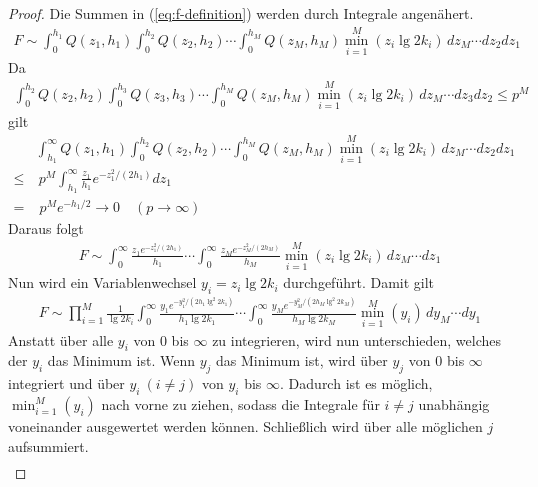 \documentclass[a4paper, 11pt, ngerman]{article}
\theoremstyle{definition}
\theoremstyle{plain}
\theoremstyle{remark}
\begin{document}
\begin{proof}
    Die Summen in (\ref{eq:f-definition}) werden durch Integrale angenähert.
    \begin{align*}
        F \sim
        \int_0^{h_1} Q(z_1, h_1)
        \int_0^{h_2} Q(z_2, h_2) \cdots
        \int_0^{h_M} Q(z_M, h_M)
        \min_{i = 1}^M(z_i \lg 2k_i) \, dz_M \cdots dz_2 dz_1
    \end{align*}
    Da
    \begin{align*}
        \int_0^{h_2} Q(z_2, h_2)
        \int_0^{h_3} Q(z_3, h_3) \cdots
        \int_0^{h_M} Q(z_M, h_M)
        \min_{i = 1}^M(z_i \lg 2k_i) \, dz_M \cdots dz_3 dz_2 \le p^M
    \end{align*}
    gilt
    \begin{align*}
            & \int_{h_1}^{\infty} Q(z_1, h_1)
        \int_0^{h_2} Q(z_2, h_2) \cdots
        \int_0^{h_M} Q(z_M, h_M)
        \min_{i = 1}^M(z_i \lg 2k_i) \, dz_M \cdots dz_2 dz_1 \\
        \le & \ p^M \int_{h_1}^{\infty}
        \frac {z_1} {h_1} e^{-z_1^2/(2h_1)} dz_1              \\
        =   & \; p^M e^{-h_1/2} \to 0 \quad (p \to \infty)
    \end{align*}
    Daraus folgt
    \begin{align*}
        F \sim
        \int_0^{\infty}
        \frac {z_1 e^{-z_1^2/(2h_1)}} {h_1}  \cdots
        \int_0^{\infty}
        \frac {z_M e^{-z_M^2/(2h_M)}} {h_M}
        \min_{i = 1}^M(z_i \lg 2k_i) \, dz_M \cdots dz_1
    \end{align*}
    Nun wird ein Variablenwechsel $y_i = z_i \lg 2k_i$ durchgeführt. Damit gilt
    \begin{align*}
        F \sim
        \prod_{i = 1}^M \frac 1 {\lg 2k_i}
        \int_0^{\infty}
        \frac {y_1 e^{-y_1^2 / (2h_1 \lg^2 2k_1)}} {h_1\lg 2k_1}  \cdots
        \int_0^{\infty}
        \frac {y_M e^{-y_M^2 / (2h_M \lg^2 2k_M)}} {h_M \lg 2k_M}
        \min_{i = 1}^M(y_i) \, dy_M \cdots dy_1
    \end{align*}
    Anstatt über alle $y_i$ von $0$ bis $\infty$ zu integrieren, wird nun unterschieden, welches der $y_i$ das Minimum ist. Wenn $y_j$ das Minimum ist, wird über $y_j$ von $0$ bis $\infty$ integriert und über $y_i \ (i \ne j)$ von $y_i$ bis $\infty$. Dadurch ist es möglich, $\min_{i = 1}^M (y_i)$ nach vorne zu ziehen, sodass die Integrale für $i \ne j$ unabhängig voneinander ausgewertet werden können. Schließlich wird über alle möglichen $j$ aufsummiert.
    \begin{align*}

\end{align*}
\end{proof}
\end{document}
